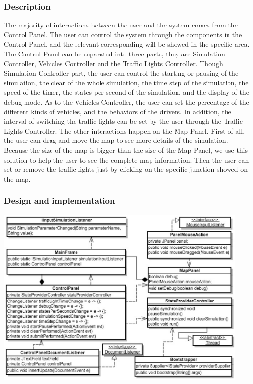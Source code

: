 \documentclass[a4paper,12pt]{article}
\begin{document}
\subsubsection{Description} The majority of interactions between the user and the system comes from the Control Panel. The user can control the system through the components in the Control Panel, and the relevant corresponding will be showed in the specific area. The Control Panel can be separated into three parts, they are Simulation Controller, Vehicles Controller and the Traffic Lights Controller. Though Simulation Controller part, the user can control the starting or pausing of the simulation, the clear of the whole simulation, the time step of the simulation, the speed of the timer, the states per second of the simulation, and the display of the debug mode. As to the Vehicles Controller, the user can set the percentage of the different kinds of vehicles, and the behaviors of the drivers. In addition, the interval of switching the traffic lights can be set by the user through the Traffic Lights Controller.
The other interactions happen on the Map Panel. First of all, the user can drag and move the map to see more details of the simulation. Because the size of the map is bigger than the size of the Map Panel, we use this solution to help the user to see the complete map information. Then the user can set or remove the traffic lights just by clicking on the specific junction showed on the map.

\subsubsection{Design and implementation}
\includegraphics[width=12.5cm]{interactionClassGraph.eps}
\end{document}
